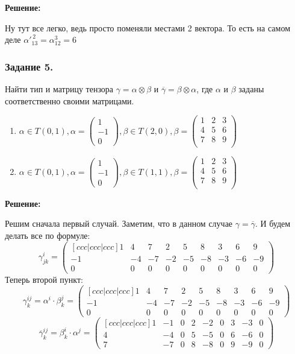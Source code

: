 \textbf{Решение:}

Ну тут все легко, ведь просто поменяли местами  2 вектора. То есть на самом деле
$\alpha'^{\, 2}_{13} = \alpha^3_{12} = 6$

\subsubsection{Задание 5.}

Найти тип и матрицу тензора $\gamma = \alpha \otimes \beta$ и $\overline{\gamma} = \beta \otimes \alpha$, где $\alpha$ и $\beta$ заданы соответственно своими матрицами.
\begin{enumerate}
    \item $\alpha \in T(0,1), \alpha = \begin{pmatrix}
        1 \\
        -1\\ 
        0
    \end{pmatrix}, \beta \in T(2,0), \beta = \begin{pmatrix}
        1 & 2 & 3\\
        4 & 5 & 6\\
        7 & 8 & 9\\
    \end{pmatrix}$
    \item $\alpha \in T(0,1),\alpha = \begin{pmatrix}
        1 \\
        -1\\ 
        0
    \end{pmatrix}, \beta \in T(1,1), \beta = \begin{pmatrix}
        1 & 2 & 3\\
        4 & 5 & 6\\
        7 & 8 & 9\\
    \end{pmatrix}$
\end{enumerate}
\textbf{Решение:}

Решим сначала первый случай. Заметим, что в данном случае $\gamma = \overline{\gamma}$. И будем делать все по формуле:
$$\gamma^i_{jk} = \begin{pmatrix}[ccc|ccc|ccc]
    1 & 4 & 7 & 2 & 5 & 8 & 3 & 6 & 9\\
    -1 & -4 & -7 & -2 &-5 &-8 & -3&-6&-9\\
    0 & 0&0&0&0&0&0&0&0
\end{pmatrix}$$
Теперь второй пункт:
$$\gamma^{ij}_k = \alpha^i \cdot \beta^j_k =\begin{pmatrix}[ccc|ccc|ccc]
    1 & 4 & 7 & 2 & 5 & 8 & 3 & 6 & 9\\
    -1 & -4 & -7 & -2 &-5 &-8 & -3&-6&-9\\
    0 & 0&0&0&0&0&0&0&0
\end{pmatrix}$$
$$\overline{\gamma}^{ij}_k =\beta^i_k\cdot \alpha^j =  \begin{pmatrix}[ccc|ccc|ccc]
    1 & -1 & 0 & 2 & -2 & 0 & 3 &-3&0\\
    4 & -4 & 0 & 5 & -5 & 0 & 6&-6&0\\
    7&-7&0&8&-8&0&9&-9&0
\end{pmatrix} $$

